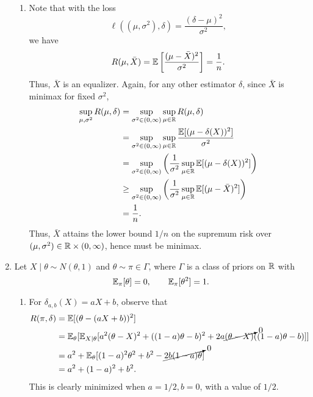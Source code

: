\documentclass[11pt]{article}
\begin{document}
\begin{enumerate}
\begin{enumerate}
            \item Note that with the loss \[
                \ell((\mu, \sigma^2), \delta) = \frac{(\delta - \mu)^2}{\sigma^2},
            \] we have \[
                R(\mu, \bar{X})
                    = \mathbb{E}\left[\frac{(\mu - \bar{X})^2}{\sigma^2}\right]
                    = \frac{1}{n}.
            \] Thus, $\bar{X}$ is an equalizer.
            Again, for any other estimator $\delta$, since $\bar{X}$ is minimax
            for fixed $\sigma^2$, \begin{align*}
                \sup_{\mu, \sigma^2} R(\mu, \delta)
                    &= \sup_{\sigma^2 \in (0, \infty)} \sup_{\mu \in \mathbb{R}} R(\mu, \delta) \\
                    &= \sup_{\sigma^2 \in (0, \infty)} \sup_{\mu \in \mathbb{R}} \frac{\mathbb{E}[(\mu - \delta(X))^2]}{\sigma^2} \\
                    &= \sup_{\sigma^2 \in (0, \infty)} \left(\frac{1}{\sigma^2} \sup_{\mu \in \mathbb{R}} \mathbb{E}[(\mu - \delta(X))^2] \right) \\
                    &\geq \sup_{\sigma^2 \in (0, \infty)} \left(\frac{1}{\sigma^2} \sup_{\mu \in \mathbb{R}} \mathbb{E}[(\mu - \bar{X})^2] \right) \\
                    &= \frac{1}{n}.
            \end{align*}
            Thus, $\bar{X}$ attains the lower bound $1/n$ on the supremum risk
            over $(\mu, \sigma^2) \in \mathbb{R} \times (0, \infty)$, hence must be
            minimax.

        \end{enumerate}




        \item Let $X\mid\theta \sim N(\theta, 1)$ and $\theta \sim \pi \in
        \Gamma$, where $\Gamma$ is a class of priors on $\mathbb{R}$ with \[
            \mathbb{E}_\pi[\theta] = 0, \qquad
            \mathbb{E}_\pi[\theta^2] = 1.
        \]
        \begin{enumerate}
            \item For $\delta_{a, b}(X) = aX + b$, observe that \begin{align*}
                R(\pi, \delta)
                    &= \mathbb{E}[(\theta - (aX + b))^2] \\
                    &= \mathbb{E}_{\theta}[\mathbb{E}_{X\mid\theta}[a^2(\theta - X)^2 + ((1 - a)\theta - b)^2 + 2a\cancelto{0}{(\theta - X)}((1 - a)\theta - b)]] \\
                    &= a^2 + \mathbb{E}_{\theta}[(1 - a)^2\theta^2 + b^2 - \cancelto{0}{2b(1 - a)\theta}] \\
                    &= a^2 + (1 - a)^2 + b^2.
            \end{align*}
            This is clearly minimized when $a = 1/2, b = 0$, with a value of
            $1/2$.


\end{enumerate}
\end{enumerate}
\end{document}
